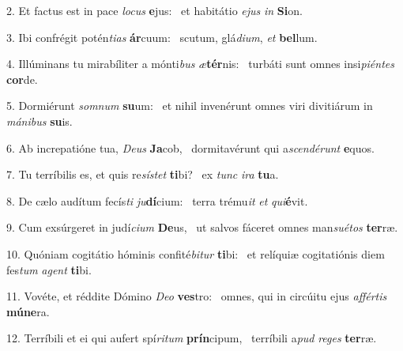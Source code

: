 2. Et factus est in pace \textit{lo}\textit{cus} \textbf{e}jus: \ast\  et habitátio \textit{e}\textit{jus} \textit{in} \textbf{Si}on.\

3. Ibi confrégit potén\textit{ti}\textit{as} \textbf{ár}cuum: \ast\  scutum, glá\textit{di}\textit{um}, \textit{et} \textbf{bel}lum.\

4. Illúminans tu mirabíliter a mónti\textit{bus} \textit{æ}\textbf{tér}nis: \ast\  turbáti sunt omnes insi\textit{pi}\textit{én}\textit{tes} \textbf{cor}de.\

5. Dormiérunt \textit{som}\textit{num} \textbf{su}um: \ast\  et nihil invenérunt omnes viri divitiárum in \textit{má}\textit{ni}\textit{bus} \textbf{su}is.\

6. Ab increpatióne tua, \textit{De}\textit{us} \textbf{Ja}cob, \ast\  dormitavérunt qui a\textit{scen}\textit{dé}\textit{runt} \textbf{e}quos.\

7. Tu terríbilis es, et quis re\textit{sís}\textit{tet} \textbf{ti}bi? \ast\  ex \textit{tunc} \textit{i}\textit{ra} \textbf{tu}a.\

8. De cælo audítum fecís\textit{ti} \textit{ju}\textbf{dí}cium: \ast\  terra trému\textit{it} \textit{et} \textit{qui}\textbf{é}vit.\

9. Cum exsúrgeret in judí\textit{ci}\textit{um} \textbf{De}us, \ast\  ut salvos fáceret omnes man\textit{su}\textit{é}\textit{tos} \textbf{ter}ræ.\

10. Quóniam cogitátio hóminis confité\textit{bi}\textit{tur} \textbf{ti}bi: \ast\  et relíquiæ cogitatiónis diem fes\textit{tum} \textit{a}\textit{gent} \textbf{ti}bi.\

11. Vovéte, et réddite Dómino \textit{De}\textit{o} \textbf{ves}tro: \ast\  omnes, qui in circúitu ejus \textit{af}\textit{fér}\textit{tis} \textbf{mú}\textbf{ne}ra.\

12. Terríbili et ei qui aufert spí\textit{ri}\textit{tum} \textbf{prín}cipum, \ast\  terríbili a\textit{pud} \textit{re}\textit{ges} \textbf{ter}ræ.\

